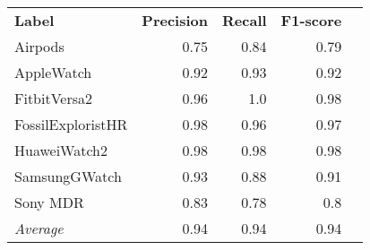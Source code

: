 \begin{tabular}{lrrrr}
    \textbf{Label} & \textbf{Precision} & \textbf{Recall} & \textbf{F1-score} \\
    Airpods & 0.75 & 0.84 & 0.79 \\
    AppleWatch & 0.92 & 0.93 & 0.92 \\
    FitbitVersa2 & 0.96 & 1.0 & 0.98 \\
    FossilExploristHR & 0.98 & 0.96 & 0.97 \\
    HuaweiWatch2 & 0.98 & 0.98 & 0.98 \\
    SamsungGWatch & 0.93 & 0.88 & 0.91 \\
    Sony MDR & 0.83 & 0.78 & 0.8 \\
    \emph{Average} & 0.94 & 0.94 & 0.94 \\
\end{tabular}
